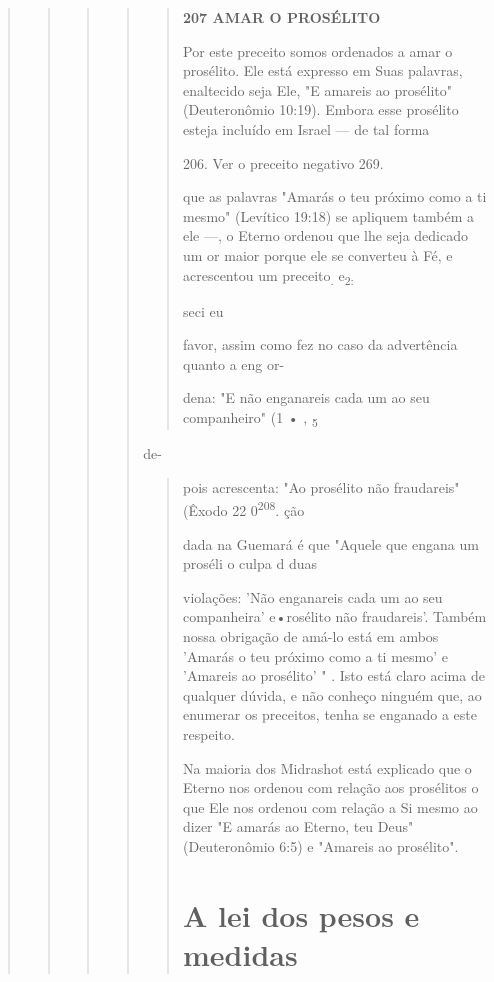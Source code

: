 \begin{quote}
\begin{quote}
\begin{quote}
\begin{quote}
\begin{quote}
\textbf{207 AMAR O PROSÉLITO}

Por este preceito somos ordenados a amar o prosélito. Ele está ex­presso
em Suas palavras, enaltecido seja Ele, "E amareis ao prosélito"
(Deute­ronômio 10:19). Embora esse prosélito esteja incluído em Israel
--- de tal forma

206. Ver o preceito negativo 269.

que as palavras "Amarás o teu próximo como a ti mesmo" (Levítico 19:18)
se apliquem também a ele ---, o Eterno ordenou que lhe seja dedicado um
or maior porque ele se converteu à Fé, e acrescentou um
preceito\textsubscript{.} e\textsubscript{2:}

seci eu

favor, assim como fez no caso da advertência quanto a eng or-

dena: "E não enganareis cada um ao seu companheiro" (1 • ,
\textsubscript{5}
\end{quote}

de-

\begin{quote}
pois acrescenta: "Ao prosélito não fraudareis" (Êxodo 22
0\textsuperscript{208}. ção

dada na Guemará é que "Aquele que engana um proséli o culpa d duas

violações: 'Não enganareis cada um ao seu companheira' e•rosélito não
fraudareis'. Também nossa obrigação de amá-lo está em ambos 'Amarás o
teu próximo como a ti mesmo' e 'Amareis ao prosélito' " . Isto está
claro acima de qualquer dúvida, e não conheço ninguém que, ao enumerar
os preceitos, te­nha se enganado a este respeito.

Na maioria dos Midrashot está explicado que o Eterno nos ordenou com
relação aos prosélitos o que Ele nos ordenou com relação a Si mesmo ao
dizer "E amarás ao Eterno, teu Deus" (Deuteronômio 6:5) e "Amareis ao
prosélito".

\section{A lei dos pesos e medidas}


\end{quote}
\end{quote}
\end{quote}
\end{quote}
\end{quote}
